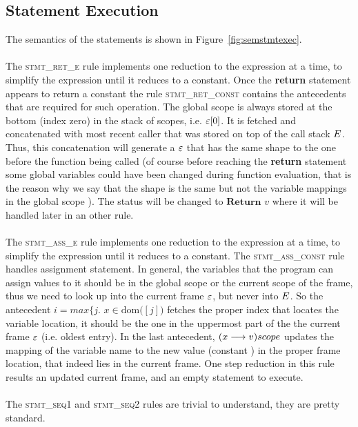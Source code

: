 \documentclass[UTF8]{article}
\begin{document}
\subsection{Statement Execution}
The semantics of the statements is shown in Figure~\ref{fig:semstmtexec}.
\\~\\
The \textsc{stmt\_ret\_e} rule implements one reduction to the expression at a time, to simplify the expression until it reduces to a constant. 
Once the \textbf{return} statement appears to return a constant the rule \textsc{stmt\_ret\_const} contains the antecedents that are required for such operation. The global scope \gscope{} is always stored at the bottom (index zero) in the stack of scopes, i.e. $\varepsilon [0]$. It is fetched and concatenated with most recent caller that was stored on top of the call stack $E$. Thus, this concatenation will generate a $\varepsilon$ that has the same shape to the one before the function being called (of course before reaching the \textbf{return} statement some global variables could have been changed during function evaluation, that is the reason why we say that the shape is the same but not the variable mappings in the global scope \gscope{}). The status will be changed to $\mathbf{Return} \,\, v$ where it will be handled later in an other rule. 
\\~\\
The \textsc{stmt\_ass\_e} rule implements one reduction to the expression at a time, to simplify the expression until it reduces to a constant.
The \textsc{stmt\_ass\_const} rule handles assignment statement. In general, the variables that the program can assign values to it should be in the global scope \gscope{} or the current scope of the frame, thus we need to look up into the current frame $\varepsilon$, but never into $E$. So the antecedent $i = max \{ j . \,\, x  \in \mathrm{dom} ( $\currsf$ [j] ) $ fetches the proper index that locates the variable location, it should be the one in the uppermost part of the the current frame $\varepsilon$ (i.e. oldest entry). In the last antecedent, $ (x \longrightarrow v )scope $ updates the mapping of the variable name \vn{} to the new value (constant \cval{}) in the proper frame location, that indeed lies in the current frame. One step reduction in this rule results an updated current frame, and an empty statement to execute.
\\~\\
The \textsc{stmt\_seq1} and \textsc{stmt\_seq2} rules are trivial to understand, they are pretty standard.
\end{document}
